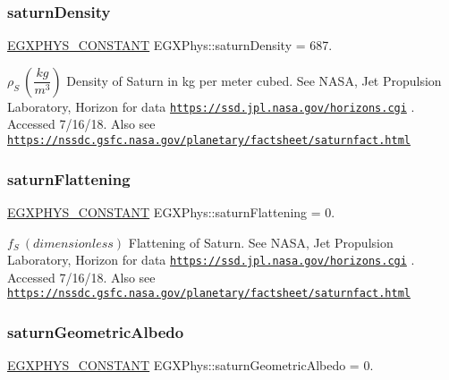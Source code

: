 \subsubsection{\texorpdfstring{saturn\+Density}{saturnDensity}}
{\footnotesize\ttfamily \mbox{\hyperlink{group___e_g_x_phys-_constants-_macros_ga76980d288494ce1714c9ac68a95ba702}{E\+G\+X\+P\+H\+Y\+S\+\_\+\+C\+O\+N\+S\+T\+A\+NT}} E\+G\+X\+Phys\+::saturn\+Density = 687.}

$\rho_{S} \ (\dfrac{kg}{m^3})$ Density of Saturn in kg per meter cubed. See N\+A\+SA, Jet Propulsion Laboratory, Horizon for data \href{https://ssd.jpl.nasa.gov/horizons.cgi}{\tt https\+://ssd.\+jpl.\+nasa.\+gov/horizons.\+cgi} . Accessed 7/16/18. Also see \href{https://nssdc.gsfc.nasa.gov/planetary/factsheet/saturnfact.html}{\tt https\+://nssdc.\+gsfc.\+nasa.\+gov/planetary/factsheet/saturnfact.\+html} \mbox{\label{group___e_g_x_phys-_constants-_astrophysics-_solar_system-_saturn-_bulk_gaaae334c1007139bf7af123c126431fc8}} 
\subsubsection{\texorpdfstring{saturn\+Flattening}{saturnFlattening}}
{\footnotesize\ttfamily \mbox{\hyperlink{group___e_g_x_phys-_constants-_macros_ga76980d288494ce1714c9ac68a95ba702}{E\+G\+X\+P\+H\+Y\+S\+\_\+\+C\+O\+N\+S\+T\+A\+NT}} E\+G\+X\+Phys\+::saturn\+Flattening = 0.}

$f_{S} \ (dimensionless)$ Flattening of Saturn. See N\+A\+SA, Jet Propulsion Laboratory, Horizon for data \href{https://ssd.jpl.nasa.gov/horizons.cgi}{\tt https\+://ssd.\+jpl.\+nasa.\+gov/horizons.\+cgi} . Accessed 7/16/18. Also see \href{https://nssdc.gsfc.nasa.gov/planetary/factsheet/saturnfact.html}{\tt https\+://nssdc.\+gsfc.\+nasa.\+gov/planetary/factsheet/saturnfact.\+html} \mbox{\label{group___e_g_x_phys-_constants-_astrophysics-_solar_system-_saturn-_bulk_ga7ba3c29bc265b7b07bd8aa66b6e2f881}} 
\subsubsection{\texorpdfstring{saturn\+Geometric\+Albedo}{saturnGeometricAlbedo}}
{\footnotesize\ttfamily \mbox{\hyperlink{group___e_g_x_phys-_constants-_macros_ga76980d288494ce1714c9ac68a95ba702}{E\+G\+X\+P\+H\+Y\+S\+\_\+\+C\+O\+N\+S\+T\+A\+NT}} E\+G\+X\+Phys\+::saturn\+Geometric\+Albedo = 0.}

